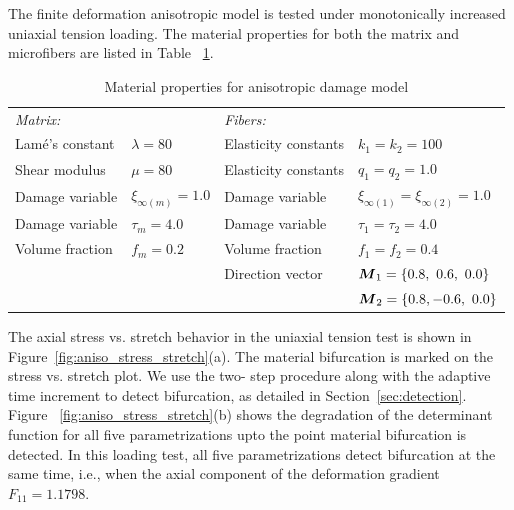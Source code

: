 \documentclass[12pt]{article}
\numberwithin{equation}{section}
\begin{document}
The finite deformation anisotropic model is tested under monotonically
increased uniaxial tension loading. The material properties for both 
the matrix and microfibers are listed in Table~
\ref{tab:aniso_material}.

\begin{table}[H]
  \begin{center}
    \begin{tabular}{ l l l l }
      \toprule
      \it{Matrix}:
      &
      
      &
     
      \it{Fibers}:
      
      &
      \\
      Lam\'{e}'s constant
      &
      $\lambda=80$
      &
      Elasticity constants
      &
      $k_1 = k_2 = 100$
      \\
      Shear modulus
      &
      $\mu = 80$
      &
      Elasticity constants
      &
      $q_1 = q_2 = 1.0$      
      \\
      Damage variable  
      &
      $\xi_{\infty(m)} = 1.0$
      &
      Damage variable
      &
      $\xi_{\infty(1)} = \xi_{\infty(2)} = 1.0$      
      \\
      Damage variable   
      &
      $\tau_m = 4.0$
      &
      Damage variable
      &
      $\tau_1 = \tau_2 = 4.0$
      \\
      Volume fraction
      &
      $f_m = 0.2$
      &
      Volume fraction
      &
      $f_1 = f_2 = 0.4$
      \\      
      &
      
      &
      Direction vector
      &
      ${\boldsymbol{M}}_1 = \{ 0.8,~0.6,~0.0\}$
      \\
      &

      &
	       
      &
      ${\boldsymbol{M}}_2 = \{ 0.8,-0.6,~0.0\}$
      \\
      \bottomrule
    \end{tabular}
    \caption{Material properties for anisotropic damage model}
    \label{tab:aniso_material}
  \end{center}
\end{table}

The axial stress vs. stretch behavior in the uniaxial tension test is 
shown in Figure~\ref{fig:aniso_stress_stretch}(a). The material 
bifurcation is marked on the stress vs. stretch plot. We use the two-
step procedure along with the adaptive time increment to detect 
bifurcation, as detailed in Section~\ref{sec:detection}. Figure~
\ref{fig:aniso_stress_stretch}(b) shows the degradation of the 
determinant function for all five parametrizations upto the point 
material bifurcation is detected. In this loading test, all five 
parametrizations detect bifurcation at the same time, i.e., when the 
axial component of the deformation gradient $F_{11} = 1.1798$. 
\end{document}
